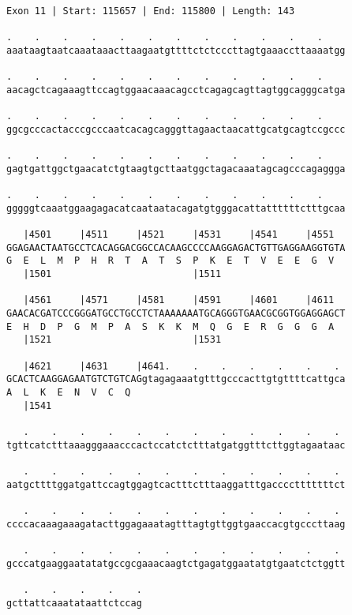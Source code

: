 \documentclass{article}
\begin{document}
\begin{Verbatim}[fontfamily=courier]
Exon 11 | Start: 115657 | End: 115800 | Length: 143

.    .    .    .    .    .    .    .    .    .    .    .    
aaataagtaatcaaataaacttaagaatgttttctctcccttagtgaaaccttaaaatgg

.    .    .    .    .    .    .    .    .    .    .    .    
aacagctcagaaagttccagtggaacaaacagcctcagagcagttagtggcagggcatga

.    .    .    .    .    .    .    .    .    .    .    .    
ggcgcccactacccgcccaatcacagcagggttagaactaacattgcatgcagtccgccc

.    .    .    .    .    .    .    .    .    .    .    .    
gagtgattggctgaacatctgtaagtgcttaatggctagacaaatagcagcccagaggga

.    .    .    .    .    .    .    .    .    .    .    .    
gggggtcaaatggaagagacatcaataatacagatgtgggacattattttttctttgcaa

   |4501     |4511     |4521     |4531     |4541     |4551  
GGAGAACTAATGCCTCACAGGACGGCCACAAGCCCCAAGGAGACTGTTGAGGAAGGTGTA
G  E  L  M  P  H  R  T  A  T  S  P  K  E  T  V  E  E  G  V  
   |1501                         |1511                      

   |4561     |4571     |4581     |4591     |4601     |4611  
GAACACGATCCCGGGATGCCTGCCTCTAAAAAAATGCAGGGTGAACGCGGTGGAGGAGCT
E  H  D  P  G  M  P  A  S  K  K  M  Q  G  E  R  G  G  G  A  
   |1521                         |1531                      

   |4621     |4631     |4641.    .    .    .    .    .    . 
GCACTCAAGGAGAATGTCTGTCAGgtagagaaatgtttgcccacttgtgttttcattgca
A  L  K  E  N  V  C  Q                                      
   |1541                                                    

   .    .    .    .    .    .    .    .    .    .    .    . 
tgttcatctttaaagggaaacccactccatctctttatgatggtttcttggtagaataac

   .    .    .    .    .    .    .    .    .    .    .    . 
aatgcttttggatgattccagtggagtcactttctttaaggatttgacccctttttttct

   .    .    .    .    .    .    .    .    .    .    .    . 
ccccacaaagaaagatacttggagaaatagtttagtgttggtgaaccacgtgcccttaag

   .    .    .    .    .    .    .    .    .    .    .    . 
gcccatgaaggaatatatgccgcgaaacaagtctgagatggaatatgtgaatctctggtt

   .    .    .    .    .
gcttattcaaatataattctccag
\end{Verbatim}
\newpage
\end{document}
